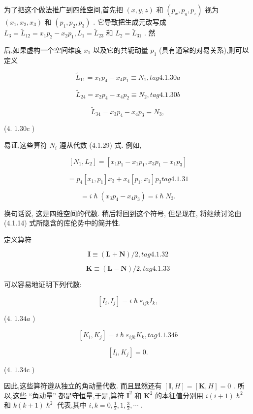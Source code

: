 为了把这个做法推广到四维空间,首先把 $\left( {x, y, z}\right)$ 和 $\left( {{p}_{x},{p}_{y},{p}_{z}}\right)$ 视为 $\left( {{x}_{1},{x}_{2},{x}_{3}}\right)$ 和 $\left( {{p}_{1},{p}_{2},{p}_{3}}\right)$ . 它导致把生成元改写成 ${L}_{3} = {\widetilde{L}}_{12} = {x}_{1}{p}_{2} - {x}_{2}{p}_{1},{L}_{1} = {\widetilde{L}}_{23}$ 和 ${L}_{2} = {\widetilde{L}}_{31}$ . 然

后,如果虚构一个空间维度 ${x}_{1}$ 以及它的共轭动量 ${p}_{1}$ (具有通常的对易关系),则可以定义

$$
{\widetilde{L}}_{11} = {x}_{1}{p}_{4} - {x}_{4}{p}_{1} \equiv {N}_{1}, tag{4. 1.30a}
$$

$$
{\widetilde{L}}_{24} = {x}_{2}{p}_{4} - {x}_{4}{p}_{2} \equiv {N}_{2}, tag{4. 1. 30b}
$$

$$
{\widetilde{L}}_{34} = {x}_{3}{p}_{4} - {x}_{4}{p}_{3} \equiv {N}_{3},
$$

(4. ${1.30}\mathrm{c}$ )

易证,这些算符 ${N}_{i}$ 遵从代数 (4.1.29) 式. 例如,

$$
\left\lbrack {{N}_{1},{L}_{2}}\right\rbrack = \left\lbrack {{x}_{1}{p}_{1} - {x}_{1}{p}_{1},{x}_{3}{p}_{1} - {x}_{1}{p}_{3}}\right\rbrack
$$

$$
= {p}_{4}\left\lbrack {{x}_{1},{p}_{1}}\right\rbrack {x}_{3} + {x}_{4}\left\lbrack {{p}_{1},{x}_{1}}\right\rbrack {p}_{3} tag{4. 1.31}
$$

$$
= i\hslash \left( {{x}_{3}{p}_{4} - {x}_{4}{p}_{3}}\right) = i\hslash {N}_{3}.
$$

换句话说, 这是四维空间的代数. 稍后将回到这个符号, 但是现在, 将继续讨论由 (4.1.14) 式所隐含的库伦势中的简并性.

定义算符

$$
\mathbf{I} \equiv \left( {\mathbf{L} + \mathbf{N}}\right) /2, tag{4. 1.32}
$$

$$
\mathbf{K} \equiv \left( {\mathbf{L} - \mathbf{N}}\right) /2, tag{4. 1.33}
$$

可以容易地证明下列代数:

$$
\left\lbrack {{I}_{i},{I}_{j}}\right\rbrack = i\hslash {\varepsilon }_{ijk}{I}_{k},
$$

(4. ${1.34a}$ )

$$
\left\lbrack {{K}_{i},{K}_{j}}\right\rbrack = i\hslash {\varepsilon }_{ijk}{K}_{k}, tag{4. 1.34b}
$$

$$
\left\lbrack {{I}_{i},{K}_{j}}\right\rbrack = 0.
$$

(4. ${1.34}\mathrm{c}$ )

因此,这些算符遵从独立的角动量代数. 而且显然还有 $\left\lbrack {\mathbf{I}, H}\right\rbrack = \left\lbrack {\mathbf{K}, H}\right\rbrack = 0$ . 所以,这些 “角动量” 都是守恒量,于是,算符 ${\mathbf{I}}^{2}$ 和 ${\mathbf{K}}^{2}$ 的本征值分别用 $i\left( {i + 1}\right) {\hslash }^{2}$ 和 $k\left( {k + 1}\right) {\hslash }^{2}$ 代表,其中 $i, k = 0,\frac{1}{2},1,\frac{3}{2},\cdots$ .

